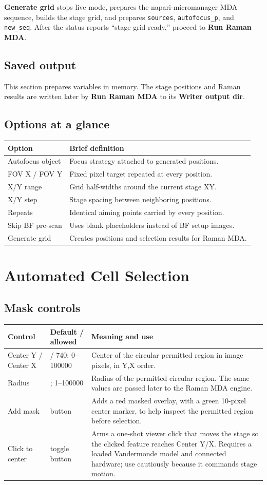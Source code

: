 \documentclass[11pt,oneside]{report}
\makeatletter
\newcommand{\ui}[1]{\textbf{#1}}
\newcommand{\code}[1]{\texttt{#1}}
\newcommand{\fieldtable}{\begin{longtable}{@{}>{\raggedright\arraybackslash}p{0.25\textwidth}>{\raggedright\arraybackslash}p{0.18\textwidth}>{\raggedright\arraybackslash}p{0.50\textwidth}@{}}\toprule\textbf{Control} & \textbf{Default / allowed} & \textbf{Meaning and use}\\\midrule\endhead}
\newcommand{\finishfieldtable}{\bottomrule\end{longtable}}
\makeatother
\begin{document}
\ui{Generate grid} stops live mode, prepares the napari-micromanager MDA sequence,
builds the stage grid, and prepares \code{sources}, \code{autofocus\_p}, and
\code{new\_seq}. After the status reports ``stage grid ready,'' proceed to
\ui{Run Raman MDA}.

\section*{Saved output}
This section prepares variables in memory. The stage positions and Raman results
are written later by \ui{Run Raman MDA} to its \ui{Writer output dir}.

\section*{Options at a glance}
\begin{longtable}{@{}p{}p{}@{}}
\toprule\textbf{Option} & \textbf{Brief definition}\\\midrule
Autofocus object & Focus strategy attached to generated positions.\\
FOV X / FOV Y & Fixed pixel target repeated at every position.\\
X/Y range & Grid half-widths around the current stage XY.\\
X/Y step & Stage spacing between neighboring positions.\\
Repeats & Identical aiming points carried by every position.\\
Skip BF pre-scan & Uses blank placeholders instead of BF setup images.\\
Generate grid & Creates positions and selection results for Raman MDA.\\
\bottomrule\end{longtable}

\chapter{Automated Cell Selection}

\section{Mask controls}
\fieldtable
Center Y / Center X & 540 / 740; 0--100000 & Center of the circular permitted region
in image pixels, in Y,X order.\\
Radius & 100; 1--100000 & Radius of the permitted circular region. The same values
are passed later to the Raman MDA engine.\\
Add mask & button & Adds a red masked overlay, with a green 10-pixel center marker,
to help inspect the permitted region before selection.\\
Click to center & toggle button & Arms a one-shot viewer click that moves the stage
so the clicked feature reaches Center Y/X. Requires a loaded Vandermonde model and
connected hardware; use cautiously because it commands stage motion.\\
\finishfieldtable
\end{document}
